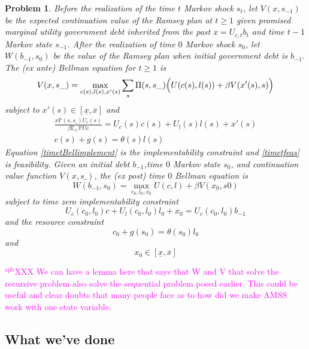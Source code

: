 \documentclass[12pt]{article}
\newcommand{\apb}[1]{\textcolor{magenta}{$^{\textrm{apb}}${#1}}}
\newcommand{\tjs}[1]{\textcolor{red}{$^{\textrm{tjs}}${#1}}}
\newcommand{\EE}{\mathbb E}
\newtheorem{problem}[theorem]{Problem}
\begin{document}
\begin{problem}\label{prob:RamseyBellman}
Before the realization of the time $t$ Markov shock $s_t$, let   $V(x, s_{-1})$ be the {\em expected} continuation value of the Ramsey plan at $t \geq 1$  given promised marginal utility government debt inherited
from the past $x = U_{c,t} b_t $ and time $t-1$ Markov state $s_{-1}$.
After the realization of time $0$ Markov shock $s_0$, let $W(b_{-1},s_0)$ be the value of the Ramsey plan when initial
government debt is $b_{-1}$. %
The (\textit{ex ante}) Bellman equation for $t\geq1$  is
	\begin{equation}\label{eqn:Bellman1}
		V(x,s\_) = \max_{c(s),l(s),x'(s)} \sum_s \Pi(s,s\_)\Bigl(U(c(s),l(s)) + \beta V(x'(s),s)\Bigr)
	\end{equation}
subject to $x'(s)\in [\underline x,\overline x]$ and
	\begin{align}
		\frac{x \mathbb{P}(s,s\_) U_c(s)}{\beta\EE_{s\_} \mathbb{P}Uc} =U_c(s)c(s)+U_l(s)l(s) + x'(s) \label{timetBellimplement}\\
		c(s) + g(s) = \theta(s)l(s) \label{timetfeas}
	\end{align}
Equation \eqref{timetBellimplement} is the implementability constraint and \eqref{timetfeas} is feasibility.
	Given an initial  debt $b_{-1}$,time $0$ Markov state $s_0$,  and continuation value function $V(x,s\_)$, the (\textit{ex post}) time $0$ Bellman equation is
	\begin{equation}\label{eqn:Bellman0}
		W(b_{-1},s_0) = \max_{c_{0},l_0,x_{0}} U(c,l) +\beta V(x_0,s0)
	\end{equation} subject to  time zero implementability constraint
	\[
		U_{c}(c_0,l_0)c + U_l(c_0,l_0) l_0 + x_0 = U_c(c_0,l_0) b_{-1}
	\]and  the resource constraint
	\[
		c_0+ g(s_0) = \theta(s_0) l_0
	\]and
	\[
		x_0 \in [\underline x,\overline x]
	\]
\end{problem}
\apb{XXX We can have a lemma here that says that W and V that solve the recursive problem also solve the sequential problem posed earlier. This could be useful and clear doubts that many people face as to how did we make AMSS work with one state variable. }

\subsection{What we've done}
\end{document}

